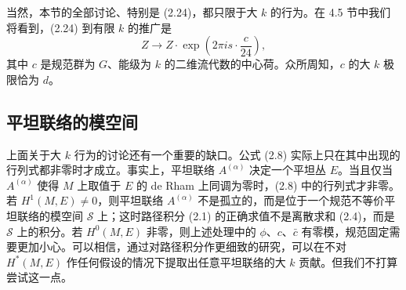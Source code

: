 \documentclass[11pt,a4paper]{article}
\begin{document}
当然，本节的全部讨论、特别是 (2.24)，都只限于大 $k$ 的行为。在 4.5 节中我们将看到，(2.24) 到有限 $k$ 的推广是
\begin{equation}
    Z\to Z\cdot\exp\left(2\pi i s\cdot\frac{c}{24}\right),
    \tag{2.25}
\end{equation}
其中 $c$ 是规范群为 $G$、能级为 $k$ 的二维流代数的中心荷。众所周知，$c$ 的大 $k$ 极限恰为 $d$。


\subsection*{平坦联络的模空间}

上面关于大 $k$ 行为的讨论还有一个重要的缺口。公式 (2.8) 实际上只在其中出现的行列式都非零时才成立。事实上，平坦联络 $A^{(\alpha)}$ 决定一个平坦丛 $E$。当且仅当 $A^{(\alpha)}$ 使得 $M$ 上取值于 $E$ 的 de Rham 上同调为零时，(2.8) 中的行列式才非零。若 $H^1(M,E)\neq0$，则平坦联络 $A^{(\alpha)}$ 不是孤立的，而是位于一个规范不等价平坦联络的模空间 $\mathcal{S}$ 上；这时路径积分 (2.1) 的正确求值不是离散求和 (2.4)，而是 $\mathcal{S}$ 上的积分。若 $H^0(M,E)$ 非零，则上述处理中的 $\phi$、$c$、$\bar{c}$ 有零模，规范固定需要更加小心。可以相信，通过对路径积分作更细致的研究，可以在不对 $H^\ast(M,E)$ 作任何假设的情况下提取出任意平坦联络的大 $k$ 贡献。但我们不打算尝试这一点。

\end{document}
